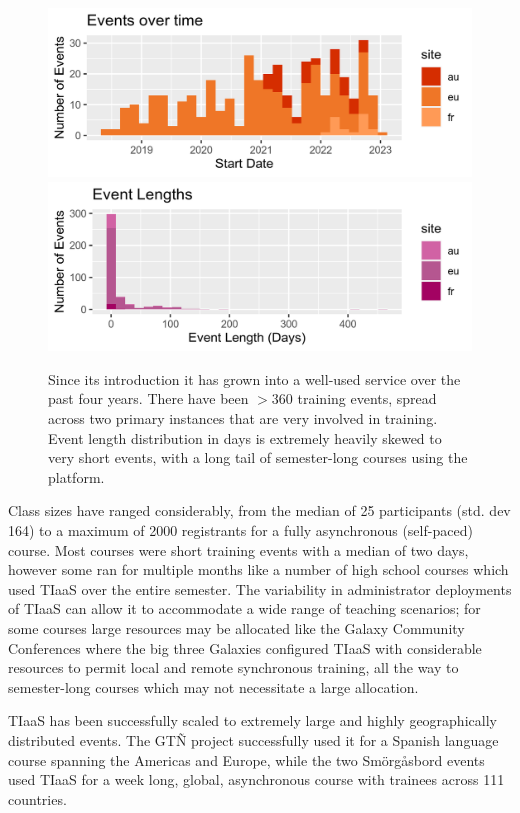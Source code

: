 \documentclass[a4paper,num-refs]{oup-contemporary}
\begin{document}
\begin{figure}[bt!]
\centering
	\includegraphics[width=\linewidth]{event-starts.png}
	\includegraphics[width=\linewidth]{event-lengths.png}
	\caption{Since its introduction it has grown into a well-used service over the past four years. There have been $>360$ training events, spread across two primary instances that are very involved in training. Event length distribution in days is extremely heavily skewed to very short events, with a long tail of semester-long courses using the platform.}\label{figure:graphs}
\end{figure}

Class sizes have ranged considerably, from the median of 25 participants (std. dev 164) to a maximum of 2000 registrants for a fully asynchronous (self-paced) course. Most courses were short training events with a median of two days, however some ran for multiple months like a number of high school courses which used TIaaS over the entire semester. The variability in administrator deployments of TIaaS can allow it to accommodate a wide range of teaching scenarios; for some courses large resources may be allocated like the Galaxy Community Conferences where the big three Galaxies configured TIaaS with considerable resources to permit local and remote synchronous training, all the way to semester-long courses which may not necessitate a large allocation.

TIaaS has been successfully scaled to extremely large and highly geographically distributed events. The GT\~{N} project successfully used it for a Spanish language course spanning the Americas and Europe, while the two Sm\"{o}rg\r{a}sbord events used TIaaS for a week long, global, asynchronous course with trainees across 111 countries.
\end{document}
